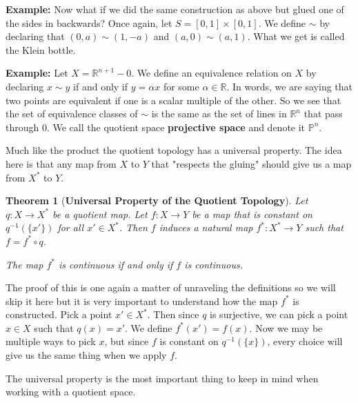 \documentclass[a4paper]{article}
\newtheorem{theorem}{Theorem}
\numberwithin{theorem}{section}
\begin{document}
\textbf{Example:} Now what if we did the same construction as above but glued one of the sides in backwards? Once again, let $S = [0,1] \times [0,1]$. We define $\sim$ by declaring that $(0,a) \sim (1,-a)$ and $(a,0) \sim (a,1)$. What we get is called the Klein bottle.

\textbf{Example:} Let $X = \mathbb{R}^{n+1} - 0$. We define an equivalence relation on $X$ by declaring $x \sim y$ if and only if $y = \alpha x$ for some $\alpha \in \mathbb{R}$. In words, we are saying that two points are equivalent if one is a scalar multiple of the other. So we see that the set of equivalence classes of $\sim$ is the same as the set of lines in $\mathbb{R}^n$ that pass through 0. We call the quotient space \textbf{projective space} and denote it $\mathbb{P}^n$.


Much like the product the quotient topology has a universal property. The idea here is that any map from $X$ to $Y$ that "respects the gluing" should give us a map from $X^*$ to $Y$.

\begin{theorem}[\textbf{Universal Property of the Quotient Topology}]
Let $q: X \rightarrow X^*$ be a quotient map. Let $f: X \rightarrow Y$ be a map that is constant on $q^{-1}(\{x'\})$ for all $x' \in X^*$. Then $f$ induces a natural map $f^*:X^* \rightarrow Y$ such that $f = f^* \circ q$.

\begin{center}
\end{center}

The map $f^*$ is continuous if and only if $f$ is continuous. 
\end{theorem}

The proof of this is one again a matter of unraveling the definitions so we will skip it here but it is very important to understand how the map $f^*$ is constructed. Pick a point $x' \in X^*$. Then since $q$ is surjective, we can pick a point $x \in X$ such that $q(x) = x'$. We define $f^*(x') = f(x)$. Now we may be multiple ways to pick $x$, but since $f$ is constant on $q^{-1}(\{x\})$, every choice will give us the same thing when we apply $f$.


The universal property is the most important thing to keep in mind when working with a quotient space.
\end{document}

